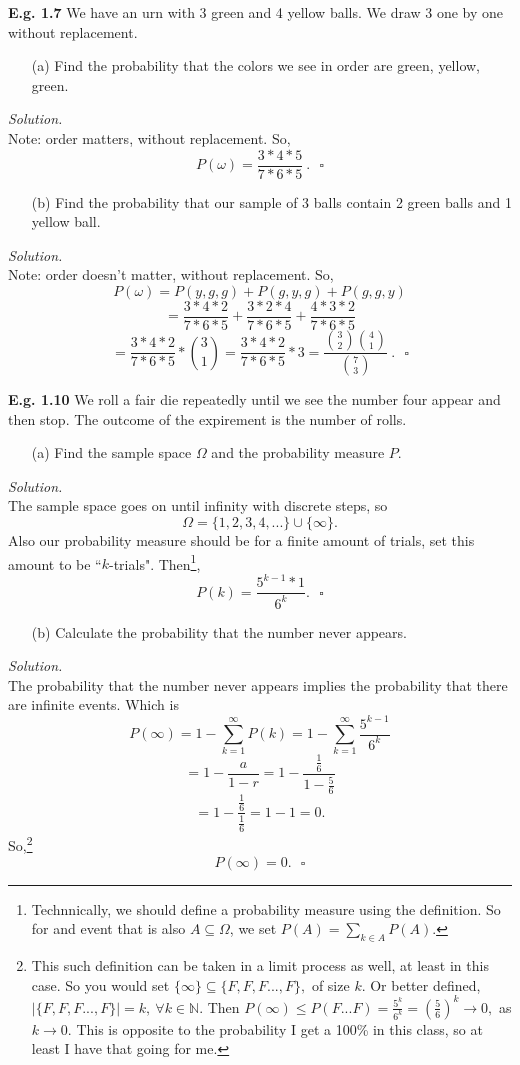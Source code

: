\documentclass[12pt]{book}
\begin{document}
\noindent \textbf{E.g. 1.7} We have an urn with 3 green and 4 yellow balls. We draw 3 one by one without replacement.
\begin{itemize}\item [(a)] Find the probability that the colors we see in order are green, yellow, green.\end{itemize}
\textit{Solution.} \\
Note: order matters, without replacement. So,
$$P(\omega) = \frac{3*4*5}{7*6*5}~.~~~\square$$
\begin{itemize}\item [(b)] Find the probability that our sample of 3 balls contain 2 green balls and 1 yellow ball.\end{itemize}
\textit{Solution.} \\
Note: order doesn't matter, without replacement. So,
$$P(\omega) = P (y,g,g) + P (g,y,g) + P(g,g,y)$$
$$=\frac{3*4*2}{7*6*5} + \frac{3*2*4}{7*6*5} + \frac{4*3*2}{7*6*5}$$
$$=\frac{3*4*2}{7*6*5} * {3 \choose 1} = \frac{3*4*2}{7*6*5} * 3 = \dfrac{{3\choose 2}{4\choose 1}}{{7\choose3}}~.~~~\square$$

\noindent \textbf{E.g. 1.10} We roll a fair die repeatedly until we see the number four appear and then stop. The outcome of the expirement is the number of rolls.
\begin{itemize}\item [(a)] Find the sample space $\Omega$ and the probability measure $P$. \end{itemize}
\textit{Solution.} \\
The sample space goes on until infinity with discrete steps, so
$$ \Omega = \big\{ 1,2,3,4,... \big\} \cup \big\{ \infty \big\}.$$
Also our probability measure should be for a finite amount of trials, set this amount to be ``$k$-trials". Then\footnote{Technnically, we should define a probability measure using the definition. So for and event that is also $A\subseteq \Omega$, we set $P(A)=\sum\limits_{k\in A} P(A)$.},
$$ P(k) = \frac{5^{k-1}*1}{6^k}.~~~\square$$
\begin{itemize}\item [(b)] Calculate the probability that the number never appears.\end{itemize}
\textit{Solution.} \\
The probability that the number never appears implies the probability that there are infinite events.
Which is
$$P(\infty)=1-\sum\limits_{k=1}^{\infty} P(k) = 1- \sum\limits_{k=1}^{\infty} \frac{5^{k-1}}{6^k}$$
$$ = 1-\frac{a}{1-r} = 1-\frac{\frac{1}{6}}{1-\frac{5}{6}}$$
$$ = 1-\frac{\frac{1}{6}}{\frac{1}{6}} = 1-1 = 0.$$
So,\footnote{This such definition can be taken in a limit process as well, at least in this case. So you would set $\{\infty \} \subseteq \{F,F,F...,F\},$ of size $k$. Or better defined, $|\{F,F,F...,F\}|=k,~\forall k\in \mathbb{N}$. Then $P(\infty) \leq P(F...F) = \frac{5^k}{6^k} = \left( \frac{5}{6} \right)^k \rightarrow 0,$ as $k\rightarrow 0$. This is opposite to the probability I get a 100\% in this class, so at least I have that going for me.}
$$P(\infty) = 0.~~~\square$$
\end{document}
